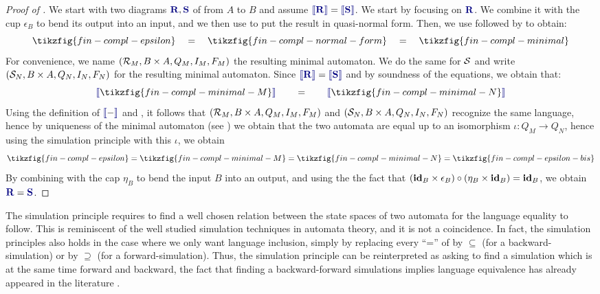 \begin{proof}[Proof of ]
	We start with two diagrams $\bR,\bS$ of  from $A$ to $B$ and assume $\binterp{\bR} = \binterp{\bS}$. We start by focusing on $\bR$. We combine it with the cup $\epsilon_B$ to bend its output into an input, and we then use  to put the result in quasi-normal form. Then, we use  followed by  to obtain:
	\[ \tikzfig{fin-compl-epsilon} \quad = \quad \tikzfig{fin-compl-normal-form} \quad=\quad \tikzfig{fin-compl-minimal} \]
	For convenience, we name $(\R_M,B \times A,Q_M,I_M,F_M)$ the resulting minimal automaton. We do the same for $\S$ and write $(\S_N,B \times A,Q_N,I_N,F_N)$ for the resulting minimal automaton. Since $\binterp{\bR} = \binterp{\bS}$ and by soundness of the equations, we obtain that:
	\[ \binterp{\tikzfig{fin-compl-minimal-M}} \qquad = \qquad \binterp{\tikzfig{fin-compl-minimal-N}} \]
	Using the definition of $\binterp{-}$ and , it follows that $(\R_M,B \times A,Q_M,I_M,F_M)$ and $(\S_N,B \times A,Q_N,I_N,F_N)$ recognize the same language, hence by uniqueness of the minimal automaton (see \cite{DBLP:books/daglib/0016921}) we obtain that the two automata are equal up to an isomorphism $\iota : Q_M \to Q_N$, hence using the simulation principle with this $\iota$, we obtain
	\[   \tikzfig{fin-compl-epsilon}  =  \tikzfig{fin-compl-minimal-M}  = \tikzfig{fin-compl-minimal-N}  =  \tikzfig{fin-compl-epsilon-bis} \]
	By combining with the cap $\eta_B$ to bend the input $B$ into an output, and using the the fact that $(\id_B \times \epsilon_B) \circ (\eta_B \times \id_B) = \id_B$, we obtain $\bR = \bS$.
\end{proof}

The simulation principle requires to find a well chosen relation between the state spaces of two automata for the language equality to follow.
This is reminiscent of the well studied simulation techniques in automata theory, and it is not a coincidence. 
In fact, the simulation principles also holds in the case where we only want language inclusion, simply by replacing every ``='' of  by $\subseteq$ (for a backward-simulation) or by $\supseteq$  (for a forward-simulation). Thus, the simulation principle can be reinterpreted as asking to find a simulation which is at the same time forward and backward, the fact that finding a backward-forward simulations implies language equivalence has already appeared in the literature \cite{lynch1995forward}.
